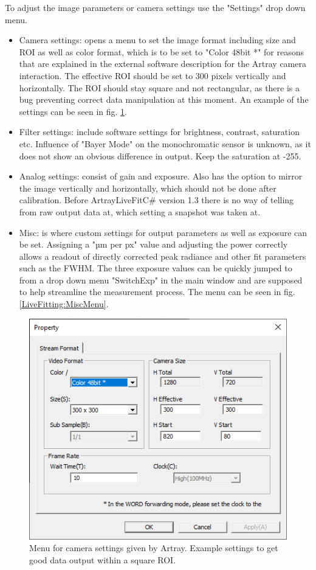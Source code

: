 \documentclass[twoside,openright,listof=numbered]{scrreprt}
\begin{document}
To adjust the image parameters or camera settings use the "Settings" drop down menu.
\begin{itemize}
\item Camera settings: opens a menu to set the image format including size and ROI as well as color format, which is to be set to "Color 48bit *" for reasons that are explained in the external software description for the Artray camera interaction.\cite{Jeindl2024} The effective ROI should be set to 300 pixels vertically and horizontally. The ROI should stay square and not rectangular, as there is a bug preventing correct data manipulation at this moment. An example of the settings can be seen in fig. \ref{fig:artrayCameraSetting}.
\item Filter settings: include software settings for brightness, contrast, saturation etc. Influence of "Bayer Mode" on the monochromatic sensor is unknown, as it does not show an obvious difference in output. Keep the saturation at -255.
\item Analog settings: consist of gain and exposure. Also has the option to mirror the image vertically and horizontally, which should not be done after calibration. Before ArtrayLiveFitC\# version 1.3 there is no way of telling from raw output data at, which setting a snapshot was taken at.
\item Misc: is where custom settings for output parameters as well as exposure can be set. Assigning a "µm per px" value and adjusting the power correctly allows a readout  of directly corrected peak radiance and other fit parameters such as the FWHM. The three exposure values can be quickly jumped to from a drop down menu "SwitchExp" in the main window and are supposed to help streamline the measurement process. The menu can be seen in fig. \ref{LiveFitting:MiscMenu}.
\end{itemize}

\begin{figure}[hbtp]
\centering
\includegraphics[width = 0.6\linewidth]{images/ArtrayExamplePics/StreamProperties.PNG}
\caption{Menu for camera settings given by Artray. Example settings to get good data output within a square ROI.\label{fig:artrayCameraSetting}}
\end{figure}
\end{document}

